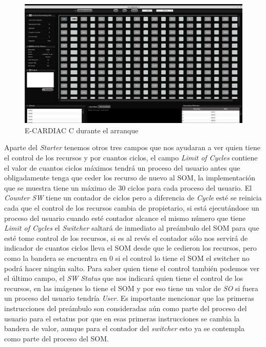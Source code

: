 \documentclass[letterpaper,12pt,oneside]{book}
\begin{document}
		\begin{figure}[h]		
			\centering
			\includegraphics[scale=0.25]{media/CARDIACC/ECARDIACC_encendida1.png}
			\caption{E-CARDIAC C durante el arranque}
			\label{fig:eccEncendida1}
		\end{figure}
	
		Aparte del \textit{Starter} tenemos otros tres campos que nos ayudaran a ver quien tiene el control de los recursos y por cuantos ciclos, el campo
		\textit{Limit of Cycles} contiene el valor de cuantos ciclos máximos tendrá un proceso del usuario antes que obligadamente tenga que ceder
		los recurso de nuevo al SOM, la implementación que se muestra tiene un máximo de 30 ciclos para cada proceso del usuario. El \textit{Counter SW} tiene
		un contador de ciclos pero a diferencia de \textit{Cycle} esté se reinicia cada que el control de los recursos cambia de propietario, si está
		ejecutándose un proceso del usuario cuando esté contador alcance el mismo número que tiene \textit{Limit of Cycles} el \textit{Switcher} saltará
		de inmediato al preámbulo del SOM para que esté tome control de los recursos, si es al revés el contador sólo nos servirá de indicador
		de cuantos ciclos lleva el SOM desde que le cedieron los recursos, pero como la bandera se encuentra en 0 si el control lo tiene el SOM el switcher
		no podrá hacer ningún salto. Para saber quien tiene el control también podemos ver el último campo, el \textit{SW Status} que nos indicará quien tiene
		el control de los recursos, en las imágenes lo tiene el SOM y por eso tiene un valor de \textit{SO} si fuera un proceso del usuario tendría \textit{User}. Es
		importante mencionar que las primeras instrucciones del preámbulo son consideradas aún como parte del proceso del usuario para el estatus por que
		en esas primeras instrucciones se cambia la bandera de valor, aunque para el contador del \textit{switcher} esto ya se contempla como parte del
		proceso del SOM.
		
\end{document}
